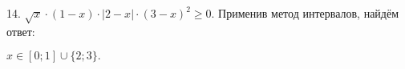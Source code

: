 14. $\sqrt{x}\cdot(1-x)\cdot|2-x|\cdot(3-x)^2\geqslant0.$
Применив метод интервалов, найдём ответ:
\begin{figure}[ht!]
\end{figure}
$x\in[0;1]\cup\{2; 3\}.$\\
